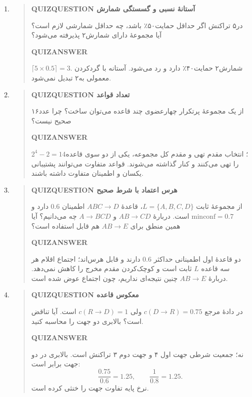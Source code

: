 \begin{enumerate}
\item\begin{quote}\textbf{QUIZQUESTION آستانهٔ نسبی و گسستگی شمارش}\par 
در۵ تراکنش اگر حداقل حمایت۵۰٪ باشد، چه حداقل شمارشی لازم است؟ آیا مجموعهٔ دارای شمارش۲ پذیرفته می‌شود؟
\par\textbf{QUIZANSWER}\par $\lceil5\times0.5\rceil=3$. شمارش۲ حمایت۴۰٪ دارد و رد می‌شود. آستانه با گردکردن معمولی به۲ تبدیل نمی‌شود.\par 
\end{quote}

\item\begin{quote}\textbf{QUIZQUESTION تعداد قواعد}\par 
از یک مجموعهٔ پرتکرار چهارعضوی چند قاعده می‌توان ساخت؟ چرا عدد۱۶ صحیح نیست؟
\par\textbf{QUIZANSWER}\par $2^4-2=14$؛ انتخاب مقدم تهی و مقدم کل مجموعه، یکی از دو سوی قاعده را تهی می‌کنند و کنار گذاشته می‌شوند. قواعد متفاوت می‌توانند پشتیبانی یکسان و اطمینان متفاوت داشته باشند.\par 
\end{quote}

\item\begin{quote}\textbf{QUIZQUESTION هرس اعتماد با شرط صحیح}\par 
از مجموعهٔ ثابت $L=\{A,B,C,D\}$، قاعدهٔ $ABC\to D$ اطمینان $0.6$ دارد و $\mathrm{minconf}=0.7$ است. دربارهٔ $AB\to CD$ و $A\to BCD$ چه می‌دانیم؟ آیا همین منطق برای $AB\to E$ هم قابل استفاده است؟
\par\textbf{QUIZANSWER}\par دو قاعدهٔ اول اطمینانی حداکثر $0.6$ دارند و قابل هرس‌اند؛ اجتماع اقلام هر سه قاعده $L$ ثابت است و کوچک‌کردن مقدم مخرج را کاهش نمی‌دهد. دربارهٔ $AB\to E$ چنین نتیجه‌ای نداریم، چون اجتماع عوض شده است.\par 
\end{quote}

\item\begin{quote}\textbf{QUIZQUESTION معکوس قاعده}\par 
در دادهٔ مرجع $c(D\to R)=0.75$ ولی $c(R\to D)=1$ است. آیا تناقض است؟ بالابری دو جهت را محاسبه کنید.
\par\textbf{QUIZANSWER}\par نه؛ جمعیت شرطی جهت اول ۴ و جهت دوم ۳ تراکنش است. بالابری در دو جهت برابر است:
\[\frac{0.75}{0.6}=1.25,\qquad\frac{1}{0.8}=1.25.\]
نرخ پایه تفاوت جهت را خنثی کرده است.\par 
\end{quote}


\end{enumerate}
